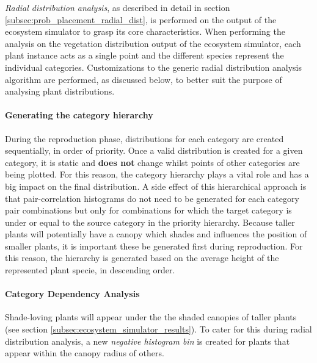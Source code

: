 \textit{Radial distribution analysis}, as described in detail in section \ref{subsec:prob_placement_radial_dist}, is performed on the output of the ecosystem simulator to grasp its core characteristics. When performing the analysis on the vegetation distribution output of the ecosystem simulator, each plant instance acts as a single point and the different species represent the individual categories. Customizations to the generic radial distribution analysis algorithm are performed, as discussed below, to better suit the purpose of analysing plant distributions.

\paragraph{Generating the category hierarchy}

During the reproduction phase, distributions for each category are created sequentially, in order of priority. Once a valid distribution is created for a given category, it is static and \textbf{does not} change whilst points of other categories are being plotted. For this reason, the category hierarchy plays a vital role and has a big impact on the final distribution. A side effect of this hierarchical approach is that pair-correlation histograms do not need to be generated for each category pair combinations but only for combinations for which the target category is under or equal to the source category in the priority hierarchy. Because taller plants will potentially have a canopy which shades and influences the position of smaller plants, it is important these be generated first during reproduction. For this reason, the hierarchy is generated based on the average height of the represented plant specie, in descending order.

\paragraph{Category Dependency Analysis}

Shade-loving plants will appear under the the shaded canopies of taller plants (see section \ref{subsec:ecosystem_simulator_results}). To cater for this during radial distribution analysis, a new \textit{negative histogram bin} is created for plants that appear within the canopy radius of others.\\

